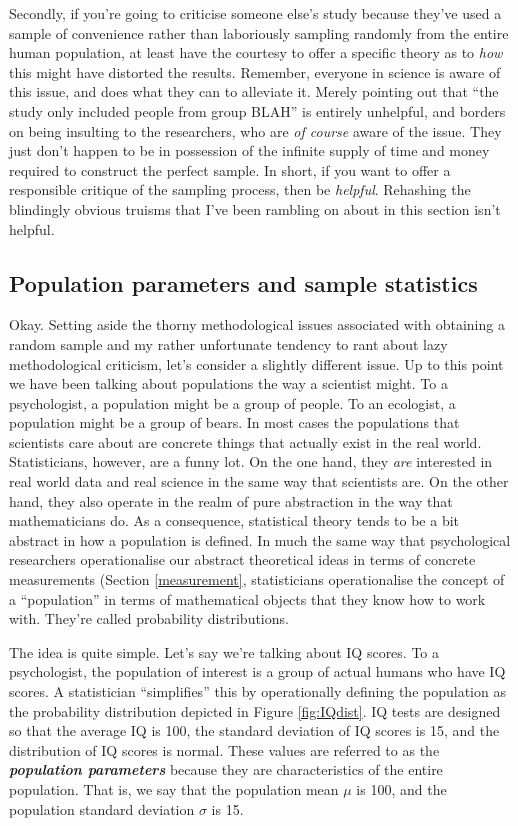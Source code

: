 \documentclass[
]{book}
\begin{document}
Secondly, if you're going to criticise someone else's study because they've used a sample of convenience rather than laboriously sampling randomly from the entire human population, at least have the courtesy to offer a specific theory as to \emph{how} this might have distorted the results. Remember, everyone in science is aware of this issue, and does what they can to alleviate it. Merely pointing out that ``the study only included people from group BLAH'' is entirely unhelpful, and borders on being insulting to the researchers, who are \emph{of course} aware of the issue. They just don't happen to be in possession of the infinite supply of time and money required to construct the perfect sample. In short, if you want to offer a responsible critique of the sampling process, then be \emph{helpful}. Rehashing the blindingly obvious truisms that I've been rambling on about in this section isn't helpful.

\hypertarget{population-parameters-and-sample-statistics}{%
\subsection{Population parameters and sample statistics}\label{population-parameters-and-sample-statistics}}

Okay. Setting aside the thorny methodological issues associated with obtaining a random sample and my rather unfortunate tendency to rant about lazy methodological criticism, let's consider a slightly different issue. Up to this point we have been talking about populations the way a scientist might. To a psychologist, a population might be a group of people. To an ecologist, a population might be a group of bears. In most cases the populations that scientists care about are concrete things that actually exist in the real world. Statisticians, however, are a funny lot. On the one hand, they \emph{are} interested in real world data and real science in the same way that scientists are. On the other hand, they also operate in the realm of pure abstraction in the way that mathematicians do. As a consequence, statistical theory tends to be a bit abstract in how a population is defined. In much the same way that psychological researchers operationalise our abstract theoretical ideas in terms of concrete measurements (Section \ref{measurement}, statisticians operationalise the concept of a ``population'' in terms of mathematical objects that they know how to work with. They're called probability distributions.

The idea is quite simple. Let's say we're talking about IQ scores. To a psychologist, the population of interest is a group of actual humans who have IQ scores. A statistician ``simplifies'' this by operationally defining the population as the probability distribution depicted in Figure \ref{fig:IQdist}. IQ tests are designed so that the average IQ is 100, the standard deviation of IQ scores is 15, and the distribution of IQ scores is normal. These values are referred to as the \textbf{\emph{population parameters}} because they are characteristics of the entire population. That is, we say that the population mean \(\mu\) is 100, and the population standard deviation \(\sigma\) is 15.
\end{document}
